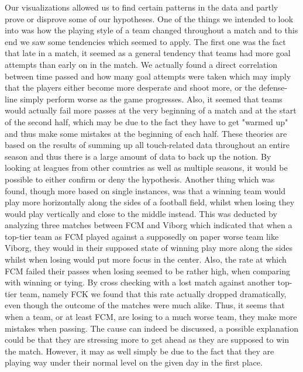 \documentclass[Report.tex]{subfiles}
\begin{document}
 

Our visualizations allowed us to find certain patterns in the data and partly prove or disprove some of our hypotheses. One of the things we intended to look into was how the playing style of a team changed throughout a match and to this end we saw some tendencies which seemed to apply. The first one was the fact that late in a match, it seemed as a general tendency that teams had more goal attempts than early on in the match. We actually found a direct correlation between time passed and how many goal attempts were taken which may imply that the players either become more desperate and shoot more, or the defense-line simply perform worse as the game progresses. Also, it seemed that teams would actually fail more passes at the very beginning of a match and at the start of the second half, which may be due to the fact they  have to get "warmed up" and thus make some mistakes at the beginning of each half.
These theories are based on the results of summing up all touch-related data throughout an entire season and thus there is a large amount of data to back up the notion. By looking at leagues from other countries as well as multiple seasons, it would be possible to either confirm or deny the hypothesis. 
Another thing which was found, though more based on single instances, was that a winning team would play more horizontally along the sides of a football field, whilst when losing they would play vertically and close to the middle instead. This was deducted by analyzing three matches between FCM and Viborg which indicated that when a top-tier team as FCM played against a supposedly on paper worse team like Viborg, they would in their supposed state of winning play more along the sides whilst when losing would put more focus in the center. Also, the rate at which FCM failed their passes when losing seemed to be rather high, when comparing with winning or tying. By cross checking with a lost match against another top-tier team, namely FCK we found that this rate actually dropped dramatically, even though the outcome of the matches were much alike. Thus, it seems that when a team, or at least FCM, are losing to a much worse team, they make more mistakes when passing. The cause can indeed be discussed, a possible explanation could be that they are stressing more to get ahead as they are supposed to win the match. However, it may as well simply be due to the fact that they are playing way under their normal level on the given day in the first place. 
\end{document}
